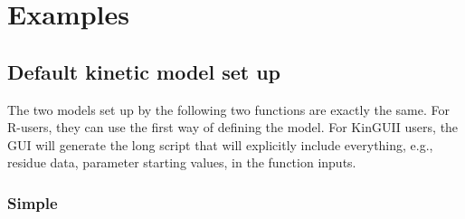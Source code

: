 \documentclass{article}
\begin{document}
\section{Examples}
\subsection{Default kinetic model set up}
The two models set up by the following two functions are exactly the
same. For R-users, they can use the first way of defining the
model. For KinGUII users, the GUI will generate the long script that
will explicitly include everything, e.g., residue data, parameter starting
values, in the function inputs.
\subsubsection{Simple}
\end{document}
